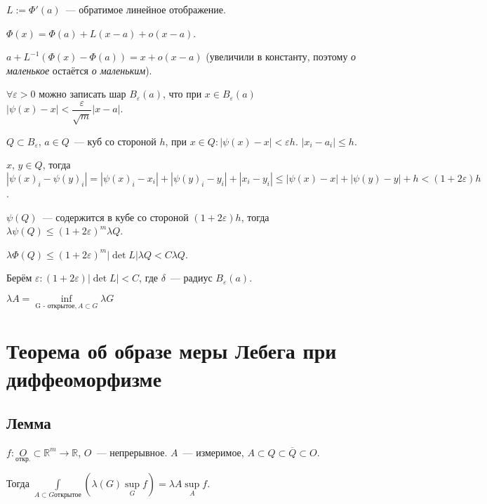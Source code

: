 \documentclass{article}
\begin{document}
            $L := \Phi'(a)$~--- обратимое линейное отображение. 
            
            $\Phi(x) = \Phi(a) + L (x - a) + o(x - a)$.
            
            $a + L^{-1}(\Phi(x) - \Phi(a)) = x + o(x - a)$ (увеличили в константу, поэтому \textit{о маленькое} остаётся \textit{о маленьким}).
            
            $\forall \varepsilon > 0$ можно записать шар $B_{\varepsilon}(a)$, что при $x \in B_{\varepsilon}(a)$ $\left| \psi(x) - x \right| < \dfrac{\varepsilon}{\sqrt{m}} |x - a|$.
            
            $Q \subset B_{\varepsilon}$, $a \in Q$~--- куб со стороной $h$, при $x \in Q : | \psi(x) - x| < \varepsilon h$. $|x_i - a_i| \leqslant h$.
            
            $x$, $y \in Q$, тогда $\left| \psi(x)_i - \psi(y)_i \right| = \left| \psi(x)_i - x_i \right| + \left| \psi(y)_i - y_i \right| + |x_i - y_i| \leqslant | \psi(x) - x | + |\psi(y) - y| + h < (1 + 2 \varepsilon)h$.
            
            $\psi(Q)$~--- содержится в кубе со стороной $(1 + 2 \varepsilon) h$, тогда $\lambda \psi(Q) \leqslant (1 + 2 \varepsilon)^m \lambda Q$.
            
            $\lambda \Phi(Q) \leqslant (1 + 2 \varepsilon)^m | \det L | \lambda Q < C \lambda Q$.
            
            Берём $\varepsilon : (1 + 2 \varepsilon) | \det L | < C$, где $\delta$~--- радиус $B_{\varepsilon} (a)$.
            
    $\lambda A = \inf\limits_{\text{G - открытое}, A \subset G} \lambda G$
            
    \newpage
    
    \section{Теорема об образе меры Лебега при диффеоморфизме}
    
        \subsection{Лемма}
    
            $f : \underset{\text{откр.}}{O} \subset \mathbb{R}^m \rightarrow \mathbb{R}$, $O$~--- непрерывное. $A$~--- измеримое, $A \subset Q \subset \overline{Q} \subset O$.
        
            Тогда $\int\limits_{A \subset G \text{открытое}} \left( \lambda (G) \sup\limits_{G} f \right) = \lambda A \sup\limits_{A} f$.
            
\end{document}
